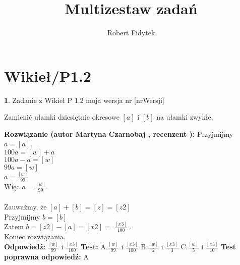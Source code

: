\documentclass[12pt, a4paper]{article}
\title{Multizestaw zadań}
\author{Robert Fidytek}
\date{}
\theoremstyle{definition} %
\newtheorem{zad}{}
\newcommand{\kategoria}[1]{\section{#1}} %
\newcommand{\zadStart}[1]{\begin{zad}#1\newline} %
\newcommand{\zadStop}{\end{zad}}   %
\newcommand{\rozwStart}[2]{\noindent \textbf{Rozwiązanie (autor #1 , recenzent #2): }\newline} %
\newcommand{\rozwStop}{\newline}                                            %
\newcommand{\odpStart}{\noindent \textbf{Odpowiedź:}\newline}    %
\newcommand{\odpStop}{\newline}                                             %
\newcommand{\testStart}{\noindent \textbf{Test:}\newline} %
\newcommand{\testStop}{\newline} %
\newcommand{\kluczStart}{\noindent \textbf{Test poprawna odpowiedź:}\newline} %
\newcommand{\kluczStop}{\newline} %
\begin{document}
\maketitle


\kategoria{Wikieł/P1.2}
\zadStart{Zadanie z Wikieł P 1.2 moja wersja nr [nrWersji]}

Zamienić ułamki dziesiętnie okresowe $[a]$ i $[b]$ na ułamki zwykłe.
\zadStop
\rozwStart{Martyna Czarnobaj}{}
Przyjmijmy $a = [a]$.\\
$ 100a = [w]+ a $\\
$ 100a - a = [w] $\\
$ 99a = [w] $\\
$ a = \frac{[w]}{99} $\\
Więc $ a = \frac{[w]}{99} $.\\
\\
Zauważmy, że $ [a] + [b] = [z]  = [z2] $\\
Przyjmijmy $ b = [b] $\\
Zatem $ b = [z2] - [a] =[x2]= $ $\frac{[x3]}{100} $ .\\
Koniec rozwiązania.\\
\rozwStop
\odpStart
$  \frac{[w]}{99} $ i $ \frac{[x3]}{100} $
\odpStop
\testStart
A.$\frac{[w]}{99} $ i $ \frac{[x3]}{100} $
B.$\frac{[w]}{2} $ i $ \frac{[x3]}{3} $
C.$\frac{[w]}{5} $ i $ \frac{[x3]}{10} $
\testStop
\kluczStart
A
\kluczStop
\end{document}
